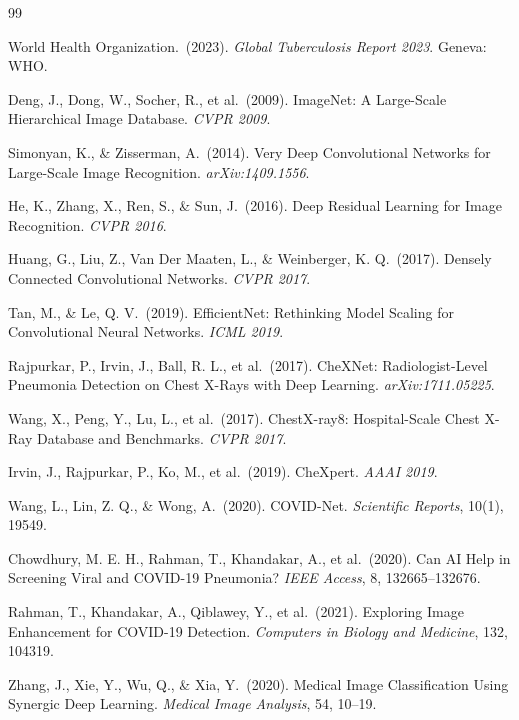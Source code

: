 \begin{thebibliography}{99}
\singlespacing
\setlength{\itemsep}{0.45em}
\setlength{\parskip}{0pt}

World Health Organization.\ (2023).
\textit{Global Tuberculosis Report 2023}.
Geneva: WHO.

Deng, J., Dong, W., Socher, R., et al.\ (2009).
ImageNet: A Large-Scale Hierarchical Image Database.
\textit{CVPR 2009}.

Simonyan, K., \& Zisserman, A.\ (2014).
Very Deep Convolutional Networks for Large-Scale Image Recognition.
\textit{arXiv:1409.1556}.

He, K., Zhang, X., Ren, S., \& Sun, J.\ (2016).
Deep Residual Learning for Image Recognition.
\textit{CVPR 2016}.

Huang, G., Liu, Z., Van Der Maaten, L., \& Weinberger, K. Q.\ (2017).
Densely Connected Convolutional Networks.
\textit{CVPR 2017}.

Tan, M., \& Le, Q. V.\ (2019).
EfficientNet: Rethinking Model Scaling for Convolutional Neural Networks.
\textit{ICML 2019}.

Rajpurkar, P., Irvin, J., Ball, R. L., et al.\ (2017).
CheXNet: Radiologist-Level Pneumonia Detection on Chest X-Rays with Deep Learning.
\textit{arXiv:1711.05225}.

Wang, X., Peng, Y., Lu, L., et al.\ (2017).
ChestX-ray8: Hospital-Scale Chest X-Ray Database and Benchmarks.
\textit{CVPR 2017}.

Irvin, J., Rajpurkar, P., Ko, M., et al.\ (2019).
CheXpert.
\textit{AAAI 2019}.

Wang, L., Lin, Z. Q., \& Wong, A.\ (2020).
COVID-Net.
\textit{Scientific Reports}, 10(1), 19549.

Chowdhury, M. E. H., Rahman, T., Khandakar, A., et al.\ (2020).
Can AI Help in Screening Viral and COVID-19 Pneumonia?
\textit{IEEE Access}, 8, 132665--132676.

Rahman, T., Khandakar, A., Qiblawey, Y., et al.\ (2021).
Exploring Image Enhancement for COVID-19 Detection.
\textit{Computers in Biology and Medicine}, 132, 104319.

Zhang, J., Xie, Y., Wu, Q., \& Xia, Y.\ (2020).
Medical Image Classification Using Synergic Deep Learning.
\textit{Medical Image Analysis}, 54, 10--19.


\end{thebibliography}
